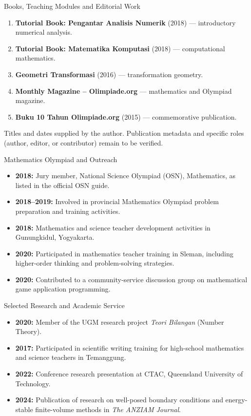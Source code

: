 \documentclass[aspectratio=169,11pt]{beamer}
\begin{document}
\begin{frame}{Books, Teaching Modules and Editorial Work}
\small
\begin{enumerate}
\item \textbf{Tutorial Book: Pengantar Analisis Numerik} (2018) --- introductory numerical analysis.
\item \textbf{Tutorial Book: Matematika Komputasi} (2018) --- computational mathematics.
\item \textbf{Geometri Transformasi} (2016) --- transformation geometry.
\item \textbf{Monthly Magazine -- Olimpiade.org} --- mathematics and Olympiad magazine.
\item \textbf{Buku 10 Tahun Olimpiade.org} (2015) --- commemorative publication.
\end{enumerate}
\vspace{0.7em}
\footnotesize Titles and dates supplied by the author. Publication metadata and specific roles (author, editor, or contributor) remain to be verified.
\end{frame}

\begin{frame}{Mathematics Olympiad and Outreach}
\begin{itemize}
\item \textbf{2018:} Jury member, National Science Olympiad (OSN), Mathematics, as listed in the official OSN guide.
\item \textbf{2018--2019:} Involved in provincial Mathematics Olympiad problem preparation and training activities.
\item \textbf{2018:} Mathematics and science teacher development activities in Gunungkidul, Yogyakarta.
\item \textbf{2020:} Participated in mathematics teacher training in Sleman, including higher-order thinking and problem-solving strategies.
\item \textbf{2020:} Contributed to a community-service discussion group on mathematical game application programming.
\end{itemize}
\end{frame}

\begin{frame}{Selected Research and Academic Service}
\begin{itemize}
\item \textbf{2020:} Member of the UGM research project \emph{Teori Bilangan} (Number Theory).
\item \textbf{2017:} Participated in scientific writing training for high-school mathematics and science teachers in Temanggung.
\item \textbf{2022:} Conference research presentation at CTAC, Queensland University of Technology.
\item \textbf{2024:} Publication of research on well-posed boundary conditions and energy-stable finite-volume methods in \emph{The ANZIAM Journal}.
\end{itemize}
\end{frame}
\end{document}
